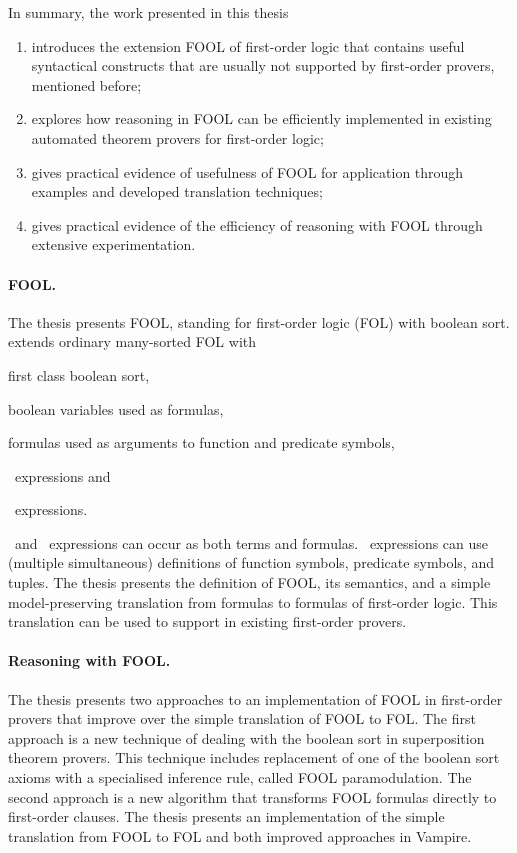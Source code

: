 In summary, the work presented in this thesis
\begin{enumerate}
  \item introduces the extension FOOL of first-order logic that contains useful syntactical constructs that are usually not supported by first-order provers, mentioned before;
  \item explores how reasoning in FOOL can be efficiently implemented in existing automated theorem provers for first-order logic;
  \item gives practical evidence of usefulness of FOOL for application through examples and developed translation techniques;
  \item gives practical evidence of the efficiency of reasoning with FOOL through extensive experimentation.
\end{enumerate}

\paragraph{FOOL.}
The thesis presents FOOL, standing for first-order logic (FOL) with boolean sort. \folb{} extends ordinary many-sorted FOL with \begin{enumerate*}[label=(\roman*)]\item first class boolean sort, \item boolean variables used as formulas, \item formulas used as arguments to function and predicate symbols, \item \ITE\ expressions and \item \LETIN\ expressions.\end{enumerate*} \ITE\ and \LETIN\ expressions can occur as both terms and formulas. \LETIN\ expressions can use (multiple simultaneous) definitions of function symbols, predicate symbols, and tuples. The thesis presents the definition of FOOL, its semantics, and a simple model-preserving translation from \folb{} formulas to formulas of first-order logic. This translation can be used to support \folb{} in existing first-order provers.

\paragraph{Reasoning with FOOL.}
The thesis presents two approaches to an implementation of FOOL in first-order provers that improve over the simple translation of FOOL to FOL. The first approach is a new technique of dealing with the boolean sort in superposition theorem provers. This technique includes replacement of one of the boolean sort axioms with a specialised inference rule, called FOOL paramodulation. The second approach is a new algorithm \nfcnf{} that transforms FOOL formulas directly to first-order clauses. The thesis presents an implementation of the simple translation from FOOL to FOL and both improved approaches in Vampire.

